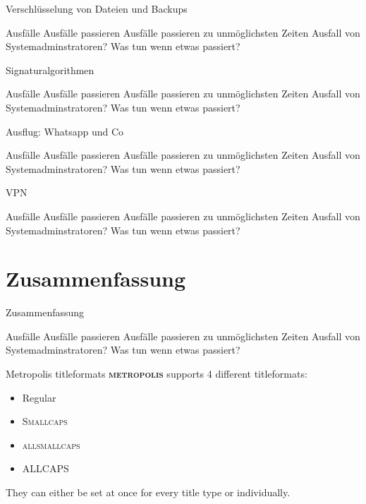 \documentclass[10pt]{beamer}
\newcommand{\themename}{\textbf{\textsc{metropolis}}\xspace}
\begin{document}
\begin{frame}[fragile]{Verschlüsselung von Dateien und Backups}
\begin{alertblock}{Ausfälle}
	Ausfälle passieren
	Ausfälle passieren zu unmöglichsten Zeiten
	Ausfall von Systemadminstratoren?
	Was tun wenn etwas passiert?
\end{alertblock}
\end{frame}

\begin{frame}[fragile]{Signaturalgorithmen}
\begin{alertblock}{Ausfälle}
	Ausfälle passieren
	Ausfälle passieren zu unmöglichsten Zeiten
	Ausfall von Systemadminstratoren?
	Was tun wenn etwas passiert?
\end{alertblock}
\end{frame}

\begin{frame}[fragile]{Ausflug: Whatsapp und Co}
\begin{alertblock}{Ausfälle}
	Ausfälle passieren
	Ausfälle passieren zu unmöglichsten Zeiten
	Ausfall von Systemadminstratoren?
	Was tun wenn etwas passiert?
\end{alertblock}
\end{frame}

\begin{frame}[fragile]{VPN}
\begin{alertblock}{Ausfälle}
	Ausfälle passieren
	Ausfälle passieren zu unmöglichsten Zeiten
	Ausfall von Systemadminstratoren?
	Was tun wenn etwas passiert?
\end{alertblock}
\end{frame}

\section{Zusammenfassung}

\begin{frame}[fragile]{Zusammenfassung}
\begin{alertblock}{Ausfälle}
	Ausfälle passieren
	Ausfälle passieren zu unmöglichsten Zeiten
	Ausfall von Systemadminstratoren?
	Was tun wenn etwas passiert?
\end{alertblock}
\end{frame}



\begin{frame}{Metropolis titleformats}
	\themename supports 4 different titleformats:
	\begin{itemize}
		\item Regular
		\item \textsc{Smallcaps}
		\item \textsc{allsmallcaps}
		\item ALLCAPS
	\end{itemize}
	They can either be set at once for every title type or individually.
\end{frame}
\end{document}
